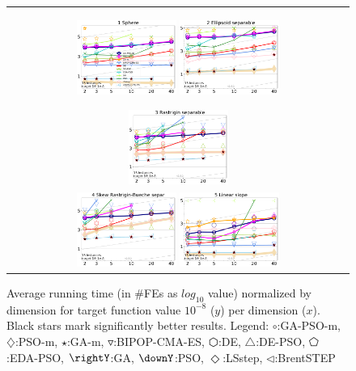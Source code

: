 \documentclass[runningheads]{llncs}
\begin{document}
\begin{figure}[h!tb] 
  \begin{tabular}
      {c@{\hspace*{-0.00001\textwidth}}
      }
     
  \includegraphics[width=0.30\textwidth]{ppfigs_f001}
  \includegraphics[width=0.30\textwidth]{ppfigs_f002}

  \includegraphics[width=0.30\textwidth]{ppfigs_f003}\\
  \includegraphics[width=0.30\textwidth]{ppfigs_f004}
  
  \includegraphics[width=0.30\textwidth]{ppfigs_f005}
  \end{tabular}
  \vspace{-3ex}
   \caption{Average running time (in \#FEs as $log_{10}$ value)
     normalized by dimension for target function value $10^{-8}$ ($y$)
     per dimension ($x$). Black stars mark significantly better
     results.
    Legend: {\color{NavyBlue}$\circ$}:GA-PSO-m, 
    {\color{Magenta}$\diamondsuit$}:PSO-m, 
    {\color{Orange}$\star$}:GA-m, 
    {\color{CornflowerBlue}$\triangledown$}:BIPOP-CMA-ES,
    {\color{red}$\varhexagon$}:DE, 
    {\color{YellowGreen}$\triangle$}:DE-PSO, 
    {\color{cyan}$\pentagon$}:EDA-PSO, 
    {\color{GreenYellow}$\rightY$}:GA, 
    {\color{ForestGreen}$\downY$}:PSO, 
    {\color{Lavender}$\Diamond$}:LSstep, 
    {\color{SkyBlue}$\triangleleft$}:BrentSTEP
    } 
  \label{fig:avg}
\end{figure}
\end{document}
